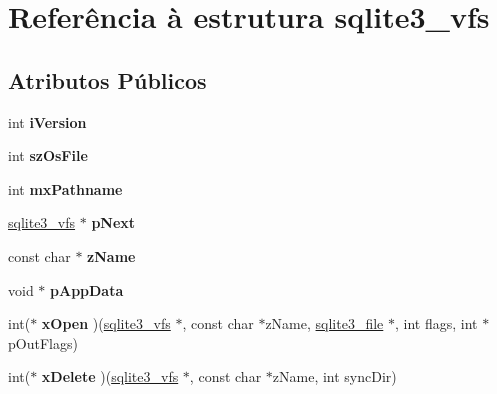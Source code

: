 \hypertarget{structsqlite3__vfs}{\section{Referência à estrutura sqlite3\-\_\-vfs}
\label{structsqlite3__vfs}
}
\subsection*{Atributos Públicos}
\begin{DoxyCompactItemize}
\item 
\hypertarget{structsqlite3__vfs_a694dd264949bd163545fe174510ed019}{int {\bfseries i\-Version}}\label{structsqlite3__vfs_a694dd264949bd163545fe174510ed019}

\item 
\hypertarget{structsqlite3__vfs_a549399081342d61134b6398562a0a997}{int {\bfseries sz\-Os\-File}}\label{structsqlite3__vfs_a549399081342d61134b6398562a0a997}

\item 
\hypertarget{structsqlite3__vfs_adb2d82c74891b00b5529fb94e7710135}{int {\bfseries mx\-Pathname}}\label{structsqlite3__vfs_adb2d82c74891b00b5529fb94e7710135}

\item 
\hypertarget{structsqlite3__vfs_a4b12c503e4083854a9c4d91697a12de3}{\hyperlink{structsqlite3__vfs}{sqlite3\-\_\-vfs} $\ast$ {\bfseries p\-Next}}\label{structsqlite3__vfs_a4b12c503e4083854a9c4d91697a12de3}

\item 
\hypertarget{structsqlite3__vfs_a01a82d3e1a7efc00a762a00751ed592b}{const char $\ast$ {\bfseries z\-Name}}\label{structsqlite3__vfs_a01a82d3e1a7efc00a762a00751ed592b}

\item 
\hypertarget{structsqlite3__vfs_a8de686c5e679ba421479ac96d6654527}{void $\ast$ {\bfseries p\-App\-Data}}\label{structsqlite3__vfs_a8de686c5e679ba421479ac96d6654527}

\item 
\hypertarget{structsqlite3__vfs_a5f35d5528d8fdf1d26e1e206879afbe1}{int($\ast$ {\bfseries x\-Open} )(\hyperlink{structsqlite3__vfs}{sqlite3\-\_\-vfs} $\ast$, const char $\ast$z\-Name, \hyperlink{structsqlite3__file}{sqlite3\-\_\-file} $\ast$, int flags, int $\ast$p\-Out\-Flags)}\label{structsqlite3__vfs_a5f35d5528d8fdf1d26e1e206879afbe1}

\item 
\hypertarget{structsqlite3__vfs_a5f547a3e54f91c7ebef140d51054bbc0}{int($\ast$ {\bfseries x\-Delete} )(\hyperlink{structsqlite3__vfs}{sqlite3\-\_\-vfs} $\ast$, const char $\ast$z\-Name, int sync\-Dir)}\label{structsqlite3__vfs_a5f547a3e54f91c7ebef140d51054bbc0}


\end{DoxyCompactItemize}
